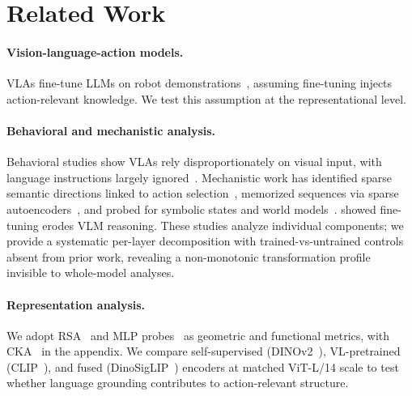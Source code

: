 \section{Related Work}\label{sec:related_work}

\paragraph{Vision-language-action models.}
VLAs fine-tune LLMs on robot demonstrations~\cite{brohan2023_rt2,kim2024_openvla,karamcheti2024}, assuming fine-tuning injects action-relevant knowledge.
We test this assumption at the representational level.

\paragraph{Behavioral and mechanistic analysis.}
Behavioral studies show VLAs rely disproportionately on visual input, with language instructions largely ignored~\cite{grant2026,hou2026,fei2025}.
Mechanistic work has identified sparse semantic directions linked to action selection~\cite{haon2025}, memorized sequences via sparse autoencoders~\cite{swann2026,buurmeijer2026}, and probed for symbolic states and world models~\cite{lu2025,molinari2025}.
\cite{fang2025} showed fine-tuning erodes VLM reasoning.
These studies analyze individual components; we provide a systematic per-layer decomposition with trained-vs-untrained controls absent from prior work, revealing a non-monotonic transformation profile invisible to whole-model analyses.

\paragraph{Representation analysis.}
We adopt RSA~\cite{kriegeskorte2008} and MLP probes~\cite{alain2017,belinkov2022} as geometric and functional metrics, with CKA~\cite{kornblith2019} in the appendix.
We compare self-supervised (DINOv2~\cite{oquab2024_dinov2}), VL-pretrained (CLIP~\cite{radford2021_clip}), and fused (DinoSigLIP~\cite{zhai2023_siglip}) encoders at matched ViT-L/14 scale to test whether language grounding contributes to action-relevant structure.
